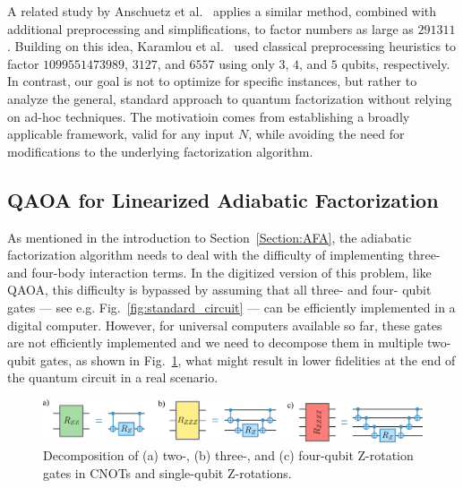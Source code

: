 A related study by Anschuetz et al.~\cite{anschuetz_variational_2018} applies a similar method, combined with additional preprocessing and simplifications, to factor numbers as large as $291311$. Building on this idea, Karamlou et al.~\cite{karamlou_analyzing_2021} used classical preprocessing heuristics to factor $1099551473989$, $3127$, and $6557$ using only $3$, $4$, and $5$ qubits, respectively. In contrast, our goal is not to optimize for specific instances, but rather to analyze the general, standard approach to quantum factorization without relying on ad-hoc techniques. The motivatioin comes from establishing a broadly applicable framework, valid for any input $N$, while avoiding the need for modifications to the underlying factorization algorithm.

\subsection{QAOA for Linearized Adiabatic Factorization}
As mentioned in the introduction to Section~\ref{Section:AFA}, the adiabatic factorization algorithm
needs to deal with the difficulty of implementing three- and four-body interaction terms. In the 
digitized version of this problem, like QAOA, this difficulty is bypassed by assuming that all three- and four- qubit gates --- see e.g. Fig.~\ref{fig:standard_circuit} --- can be efficiently implemented in a digital computer. However, for universal computers available so far, these gates are not efficiently implemented and we need to decompose them in multiple two-qubit gates, as shown in Fig.~\ref{fig:gate_decomposition}, what might result in lower fidelities at the end of the quantum circuit in a real scenario.

\begin{figure}[h]
    \centering
    \includegraphics[width=1\textwidth]{02-factorization/figs/gate_decomposition.pdf}
    \caption{Decomposition of (a) two-, (b) three-, and (c) four-qubit Z-rotation gates in CNOTs and
    single-qubit Z-rotations.}
    \label{fig:gate_decomposition}
\end{figure}

